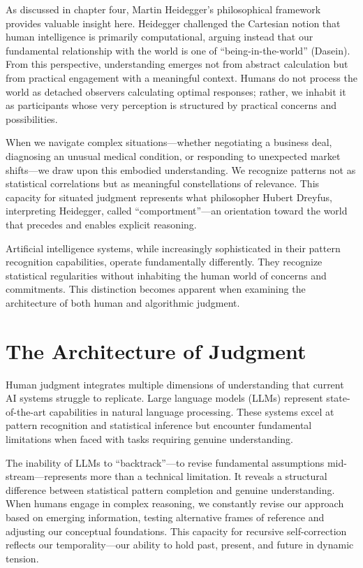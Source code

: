 \documentclass[
  Letterpaper,
]{scrbook}
\begin{document}
As discussed in chapter four, Martin
Heidegger's philosophical framework provides
valuable insight here. Heidegger challenged the Cartesian notion that
human intelligence is primarily computational, arguing instead that our
fundamental relationship with the world is one of
``being-in-the-world''
(Dasein). From this perspective,
understanding emerges not from abstract calculation but from practical
engagement with a meaningful context. Humans do not process the world as
detached observers calculating optimal responses; rather, we inhabit it
as participants whose very perception is structured by practical
concerns and possibilities.

When we navigate complex situations---whether negotiating a business
deal, diagnosing an unusual medical condition, or responding to
unexpected market shifts---we draw upon this embodied understanding. We
recognize patterns not as statistical correlations but as meaningful
constellations of relevance. This capacity for situated judgment
represents what philosopher Hubert Dreyfus,
interpreting Heidegger, called
``comportment''---an orientation
toward the world that precedes and enables explicit reasoning.

Artificial intelligence systems, while increasingly sophisticated in
their pattern recognition
capabilities, operate fundamentally differently. They recognize
statistical regularities without inhabiting the human world of concerns
and commitments. This distinction becomes apparent when examining the
architecture of both human and algorithmic judgment.

\section{The Architecture of
Judgment}\label{the-architecture-of-judgment}

Human judgment integrates multiple dimensions of understanding that
current AI systems struggle to replicate. Large language
models (LLMs) represent
state-of-the-art capabilities in natural language processing. These
systems excel at pattern recognition and statistical inference but
encounter fundamental limitations when faced with tasks requiring
genuine understanding.

The inability of LLMs to ``backtrack''---to revise fundamental
assumptions mid-stream---represents more than a technical limitation. It
reveals a structural difference between statistical pattern completion
and genuine understanding. When humans engage in complex reasoning, we
constantly revise our approach based on emerging information, testing
alternative frames of reference and adjusting our conceptual
foundations. This capacity for recursive self-correction reflects our
temporality---our ability to hold past, present, and future in dynamic
tension.
\end{document}
